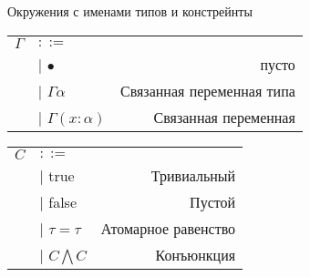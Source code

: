 \documentclass[10pt, mathserif]{beamer}
\let\\\tabularnewline
\let\\\tabularnewline
\theoremstyle{definition}
\begin{document}
\begin{frame}[c]{Окружения с именами типов и констрейнты}
\begin{tabular}{l l r}
  $\Gamma$ & $::=$ & \\
  &| $\bullet$ & пусто \\
  &| $\Gamma \alpha$  & Связанная переменная типа \\
  &| $\Gamma (x: \alpha)$ & Связанная переменная \\
\end{tabular}

\vspace{1cm}

\begin{tabular}{l l r}
  $C$ & $::=$ & \\
  &| true  & Тривиальный \\
  &| false & Пустой \\
  &| $\tau=\tau$ & Атомарное равенство\\
  &| $C \bigwedge C $ & Конъюнкция\\
\end{tabular}

\end{frame}
\end{document}
